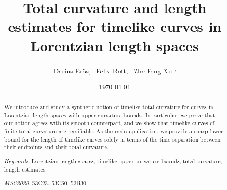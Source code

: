 \documentclass[hidelinks,12pt,a4paper]{article}
\title{Total curvature and length estimates for timelike curves in Lorentzian length spaces}
\author{Darius Er\"os\footnotemark[1], \,\,\,Felix Rott\footnotemark[2], \,\,\,Zhe-Feng Xu\footnotemark[2]\,\,\textsuperscript{,}\footnotemark[3]}
\date{\today}
\numberwithin{equation}{section}
\theoremstyle{plain}
\theoremstyle{definition}
\begin{document}
\maketitle


\begin{abstract}
We introduce and study a synthetic notion of timelike total curvature for curves in Lorentzian length spaces with upper curvature bounds. 
In particular, we prove that our notion agrees with its smooth counterpart, and we show that timelike curves of finite total curvature are rectifiable. 
As the main application, we provide a sharp lower bound for the length of timelike curves solely in terms of the time separation between their endpoints and their total curvature. %

\bigskip

\noindent
\emph{Keywords:} Lorentzian length spaces, timelike upper curvature bounds, total curvature, length estimates
\medskip

\noindent
\emph{MSC2020:}
53C23, %
53C50, %
53B30 %
\end{abstract}
\tableofcontents
\end{document}

